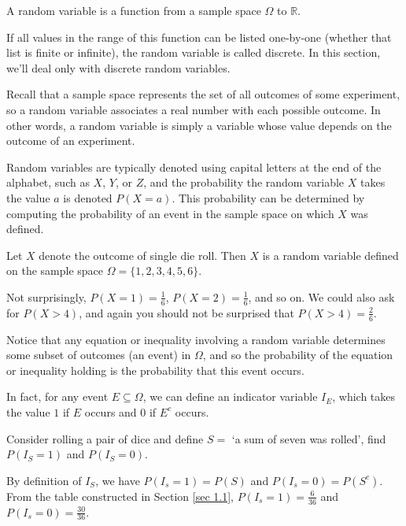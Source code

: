 \begin{defn}\label{RandomVariableDef} A random variable is a function from a sample space $\Omega$ to $\mathbb{R}$. 
\par
\noindent If all values in the range of this function can be listed one-by-one (whether that list is finite or infinite), the random variable is called discrete. In this section, we'll deal only with discrete random variables.
\end{defn}
\par
Recall that a sample space represents the set of all outcomes of some experiment, so a random variable associates a real number with each possible outcome. In other words, a random variable is simply a variable whose value depends on the outcome of an experiment.
\par
Random variables are typically denoted using capital letters at the end of the alphabet, such as $X$, $Y$, or $Z$, and the probability the random variable $X$ takes the value $a$ is denoted $P(X = a)$. This probability can be determined by computing the probability of an event in the sample space on which $X$ was defined.

\begin{examp} Let $X$ denote the outcome of single die roll. Then $X$ is a random variable defined on the sample space $\Omega = \{1,2,3,4,5,6\}$.
\par
\noindent Not surprisingly, $P(X = 1) = \frac{1}{6}$, $P(X = 2) = \frac{1}{6}$, and so on. We could also ask for $P(X > 4)$, and again you should not be surprised that $P(X > 4) = \frac{2}{6}$.
\end{examp}

\par
Notice that any equation or inequality involving a random variable determines some subset of outcomes (an event) in $\Omega$, and so the probability of the equation or inequality holding is the probability that this event occurs.
\par
In fact, for any event $E \subseteq \Omega$, we can define an indicator variable $I_{E}$, which takes the value $1$ if $E$ occurs and $0$ if $E^c$ occurs. 

\begin{examp}Consider rolling a pair of dice and define $S =$ `a sum of seven was rolled', find $P(I_S = 1)$ and $P(I_S = 0)$.
\par
\noindent By definition of $I_S$, we have $P(I_s = 1) = P(S)$ and $P(I_s = 0) = P(S^c)$. From the table constructed in Section \ref{sec 1.1}, $P(I_s = 1) = \frac{6}{36}$ and $P(I_s = 0) = \frac{30}{36}$.
\end{examp}

